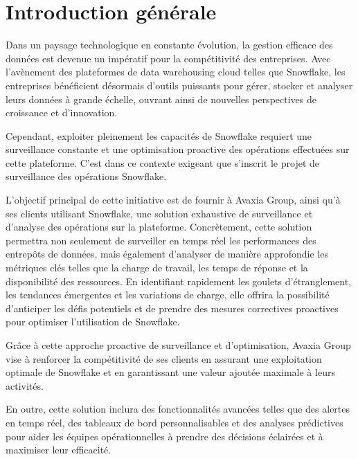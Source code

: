 \chapter*{Introduction générale}

\par Dans un paysage technologique en constante évolution, la gestion efficace des données est devenue un impératif pour la compétitivité des entreprises. Avec l'avènement des plateformes de data warehousing cloud telles que Snowflake, les entreprises bénéficient désormais d'outils puissants pour gérer, stocker et analyser leurs données à grande échelle, ouvrant ainsi de nouvelles perspectives de croissance et d'innovation.
\newline
\par Cependant, exploiter pleinement les capacités de Snowflake requiert une surveillance constante et une optimisation proactive des opérations effectuées sur cette plateforme. C'est dans ce contexte exigeant que s'inscrit le projet de surveillance des opérations Snowflake.
\newline
\par L'objectif principal de cette initiative est de fournir à Avaxia Group, ainsi qu'à ses clients utilisant Snowflake,
une solution exhaustive de surveillance et d'analyse des opérations sur la plateforme. Concrètement, cette solution permettra non seulement de surveiller en temps réel les performances des entrepôts de données, mais également d'analyser de manière approfondie les métriques clés telles que la charge de travail, les temps de réponse et la disponibilité des ressources.
En identifiant rapidement les goulets d'étranglement, les tendances émergentes et les variations de charge, elle offrira la possibilité d'anticiper les défis potentiels et de prendre des mesures correctives proactives pour optimiser l'utilisation de Snowflake.
\newline
\par Grâce à cette approche proactive de surveillance et d'optimisation, Avaxia Group vise à renforcer la compétitivité de ses clients en assurant une exploitation optimale de Snowflake et en garantissant une valeur ajoutée maximale à leurs activités.
\par En outre, cette solution inclura des fonctionnalités avancées telles que des alertes en temps réel, des tableaux de bord personnalisables et des analyses prédictives pour aider les équipes opérationnelles à prendre des décisions éclairées et à maximiser leur efficacité. 
